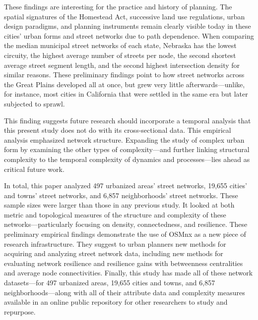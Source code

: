 \documentclass{article}
\begin{document}
These findings are interesting for the practice and history of planning. The spatial signatures of the Homestead Act, successive land use regulations, urban design paradigms, and planning instruments remain clearly visible today in these cities' urban forms and street networks due to path dependence. When comparing the median municipal street networks of each state, Nebraska has the lowest circuity, the highest average number of streets per node, the second shortest average street segment length, and the second highest intersection density for similar reasons. These preliminary findings point to how street networks across the Great Plains developed all at once, but grew very little afterwards---unlike, for instance, most cities in California that were settled in the same era but later subjected to sprawl. 

This finding suggests future research should incorporate a temporal analysis that this present study does not do with its cross-sectional data. This empirical analysis emphasized network structure. Expanding the study of complex urban form by examining the other types of complexity---and further linking structural complexity to the temporal complexity of dynamics and processes---lies ahead as critical future work. 

In total, this paper analyzed 497 urbanized areas' street networks, 19,655 cities' and towns' street networks, and 6,857 neighborhoods' street networks. These sample sizes were larger than those in any previous study. It looked at both metric and topological measures of the structure and complexity of these networks---particularly focusing on density, connectedness, and resilience. These preliminary empirical findings demonstrate the use of OSMnx as a new piece of research infrastructure. They suggest to urban planners new methods for acquiring and analyzing street network data, including new methods for evaluating network resilience and resilience gains with betweenness centralities and average node connectivities. Finally, this study has made all of these network datasets---for 497 urbanized areas, 19,655 cities and towns, and 6,857 neighborhoods---along with all of their attribute data and complexity measures available in an online public repository for other researchers to study and repurpose.


\end{document}
